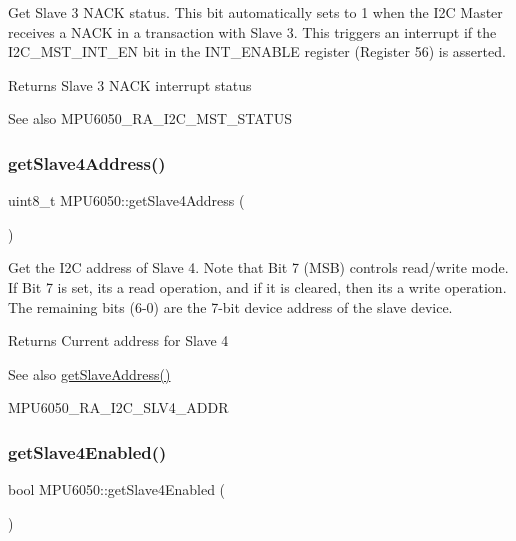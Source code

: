 Get Slave 3 N\+A\+CK status. This bit automatically sets to 1 when the I2C Master receives a N\+A\+CK in a transaction with Slave 3. This triggers an interrupt if the I2\+C\+\_\+\+M\+S\+T\+\_\+\+I\+N\+T\+\_\+\+EN bit in the I\+N\+T\+\_\+\+E\+N\+A\+B\+LE register (Register 56) is asserted. \begin{DoxyReturn}{Returns}
Slave 3 N\+A\+CK interrupt status 
\end{DoxyReturn}
\begin{DoxySeeAlso}{See also}
M\+P\+U6050\+\_\+\+R\+A\+\_\+\+I2\+C\+\_\+\+M\+S\+T\+\_\+\+S\+T\+A\+T\+US 
\end{DoxySeeAlso}
\mbox{\label{class_m_p_u6050_a4278dec5fec25be9a6f45b51a3373ad2}} 
\subsubsection{\texorpdfstring{getSlave4Address()}{getSlave4Address()}}
{\footnotesize\ttfamily uint8\+\_\+t M\+P\+U6050\+::get\+Slave4\+Address (\begin{DoxyParamCaption}{ }\end{DoxyParamCaption})}

Get the I2C address of Slave 4. Note that Bit 7 (M\+SB) controls read/write mode. If Bit 7 is set, it\textquotesingle{}s a read operation, and if it is cleared, then it\textquotesingle{}s a write operation. The remaining bits (6-\/0) are the 7-\/bit device address of the slave device.

\begin{DoxyReturn}{Returns}
Current address for Slave 4 
\end{DoxyReturn}
\begin{DoxySeeAlso}{See also}
\mbox{\hyperlink{class_m_p_u6050_af75b9f7ccac48515c7544238db0e6863}{get\+Slave\+Address()}} 

M\+P\+U6050\+\_\+\+R\+A\+\_\+\+I2\+C\+\_\+\+S\+L\+V4\+\_\+\+A\+D\+DR 
\end{DoxySeeAlso}
\mbox{\label{class_m_p_u6050_a4b9e13d6776ba99e042773873557bedd}} 
\subsubsection{\texorpdfstring{getSlave4Enabled()}{getSlave4Enabled()}}
{\footnotesize\ttfamily bool M\+P\+U6050\+::get\+Slave4\+Enabled (\begin{DoxyParamCaption}{ }\end{DoxyParamCaption})}

